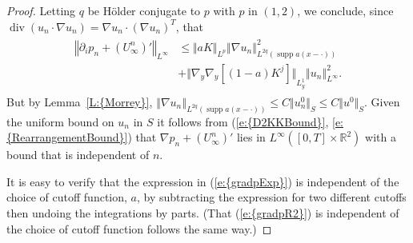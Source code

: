 \documentclass[reqno,openright,11pt,twoside]{amsart}
\theoremstyle{definition}
\numberwithin{equation}{section}
\begin{document}
\begin{proof}
Letting $q$ be {H\"{o}lder\xspace} conjugate to $p$ with $p$ in $(1, 2)$, we conclude, since $\operatorname{div} (u_n \cdot {\ensuremath{\nabla}} u_n) = {\ensuremath{\nabla}} u_n \cdot ({\ensuremath{\nabla}} u_n)^T$, that
\begin{align*} 
	\begin{split}
	{\ensuremath{\left\Vert {{\ensuremath{\partial}}_i p_n + (U_{\ensuremath{\infty}}^n)'} \right\Vert}}_{L^{\ensuremath{\infty}}}
		&\le {\ensuremath{\Vert {a K} \Vert}}_{L^p}
			{\ensuremath{\left\Vert {{\ensuremath{\nabla}} u_n} \right\Vert}}_{L^{2q}(\operatorname{supp} a(x - \cdot))}^2 \\
		&
			+ {\ensuremath{\Vert {{\ensuremath{\nabla}}_y {\ensuremath{\nabla}}_y {\ensuremath{\left[ {(1 - a) K^j} \right]}}} \Vert}}_{L^1_y}
				{\ensuremath{\left\Vert {u_n} \right\Vert}}_{L^{\ensuremath{\infty}}}^2.
	\end{split}
\end{align*}
But by {Lemma~\ref{L:{Morrey}}},
$
	{\ensuremath{\left\Vert {{\ensuremath{\nabla}} u_n} \right\Vert}}_{L^{2q}(\operatorname{supp} a(x - \cdot))}
		\le C {\ensuremath{\Vert {u^0_n} \Vert}}_S
		\le C {\ensuremath{\Vert {u^0} \Vert}}_S.
$
Given the uniform bound on $u_n$ in $S$ it follows from {(\ref{e:{D2KKBound}}, \ref{e:{RearrangementBound}})}
that ${\ensuremath{\nabla}} p_n + (U_{\ensuremath{\infty}}^n)'$ lies in $L^{\ensuremath{\infty}}([0, T] \times {\ensuremath{{\ensuremath{\mathbb{{R}}}}}}^2)$ with a bound that is independent of $n$.

It is easy to verify that the expression in {(\ref{e:{gradpExp}})} is independent of the choice of cutoff function, $a$, by subtracting the expression for two different cutoffs then undoing the integrations by parts. (That {(\ref{e:{gradpR2}})} is independent of the choice of cutoff function follows the same way.)
\end{proof}
\end{document}
